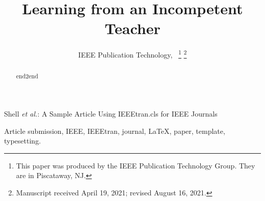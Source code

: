 \documentclass[journal]{IEEEtran}
\begin{document}
\title{Learning from an Incompetent Teacher}

\author{IEEE Publication Technology,~
\thanks{This paper was produced by the IEEE Publication Technology Group. They are in Piscataway, NJ.}%
\thanks{Manuscript received April 19, 2021; revised August 16, 2021.}}

%
{Shell \MakeLowercase{\textit{et al.}}: A Sample Article Using IEEEtran.cls for IEEE Journals}


\maketitle

\begin{abstract}
end2end 
\end{abstract}

\begin{IEEEkeywords}
Article submission, IEEE, IEEEtran, journal, \LaTeX, paper, template, typesetting.
\end{IEEEkeywords}







\vfill
\end{document}
